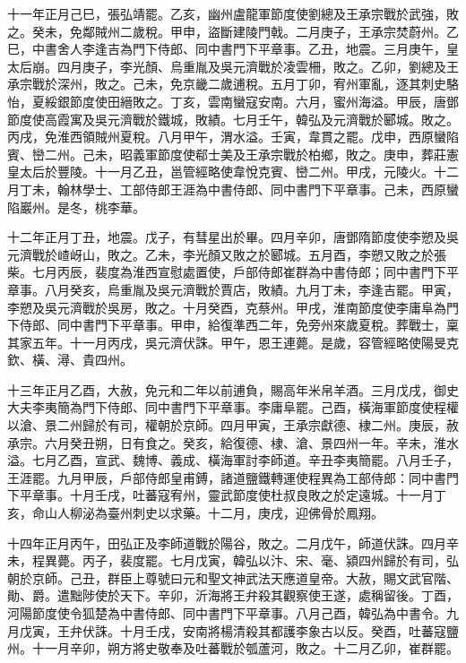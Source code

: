 \begin{pinyinscope}
 十一年正月己巳，張弘靖罷。乙亥，幽州盧龍軍節度使劉總及王承宗戰於武強，敗之。癸未，免鄰賊州二歲稅。甲申，盜斷建陵門戟。二月庚子，王承宗焚蔚州。乙巳，中書舍人李逢吉為門下侍郎、同中書門下平章事。乙丑，地震。三月庚午，皇太后崩。四月庚子，李光顏、烏重胤及吳元濟戰於凌雲柵，敗之。乙卯，劉總及王承宗戰於深州，敗之。己未，免京畿二歲逋稅。五月丁卯，宥州軍亂，逐其刺史駱怡，夏綏銀節度使田縉敗之。丁亥，雲南蠻寇安南。六月，蜜州海溢。甲辰，唐鄧節度使高霞寓及吳元濟戰於鐵城，敗績。七月壬午，韓弘及元濟戰於郾城。敗之。丙戌，免淮西領賊州夏稅。八月甲午，渭水溢。壬寅，韋貫之罷。戊申，西原蠻陷賓、巒二州。己未，昭義軍節度使郗士美及王承宗戰於柏鄉，敗之。庚申，葬莊憲皇太后於豐陵。十一月乙丑，邕管經略使韋悅克賓、巒二州。甲戌，元陵火。十二月丁未，翰林學士、工部侍郎王涯為中書侍郎、同中書門下平章事。己未，西原蠻陷巖州。是冬，桃李華。



 十二年正月丁丑，地震。戊子，有彗星出於畢。四月辛卯，唐鄧隋節度使李愬及吳元濟戰於嵖岈山，敗之。乙未，李光顏又敗之於郾城。五月酉，李愬又敗之於張柴。七月丙辰，裴度為淮西宣慰處置使，戶部侍郎崔群為中書侍郎；同中書門下平章事。八月癸亥，烏重胤及吳元濟戰於賈店，敗績。九月丁未，李逢吉罷。甲寅，李愬及吳元濟戰於吳房，敗之。十月癸酉，克蔡州。甲戌，淮南節度使李庸阜為門下侍郎、同中書門下平章事。甲申，給復準西二年，免旁州來歲夏稅。葬戰士，稟其家五年。十一月丙戌，吳元濟伏誅。甲午，恩王連薨。是歲，容管經略使陽旻克欽、橫、潯、貴四州。



 十三年正月乙酉，大赦，免元和二年以前逋負，賜高年米帛羊酒。三月戊戌，御史大夫李夷簡為門下侍郎、同中書門下平章事。李庸阜罷。己酉，橫海軍節度使程權以滄、景二州歸於有司，權朝於京師。四月甲寅，王承宗獻德、棣二州。庚辰，赦承宗。六月癸丑朔，日有食之。癸亥，給復德、棣、滄、景四州一年。辛未，淮水溢。七月乙酉，宣武、魏博、義成、橫海軍討李師道。辛丑李夷簡罷。八月壬子，王涯罷。九月甲辰，戶部侍郎皇甫鎛，諸道鹽鐵轉運使程異為工部侍郎：同中書門下平章事。十月壬戌，吐蕃寇宥州，靈武節度使杜叔良敗之於定遠城。十一月丁亥，命山人柳泌為臺州刺史以求藥。十二月，庚戌，迎佛骨於鳳翔。



 十四年正月丙午，田弘正及李師道戰於陽谷，敗之。二月戊午，師道伏誅。四月辛未，程異薨。丙子，裴度罷。七月戊寅，韓弘以汴、宋、毫、潁四州歸於有司，弘朝於京師。己丑，群臣上尊號曰元和聖文神武法天應道皇帝。大赦，賜文武官階、勛、爵。遣黜陟使於天下。辛卯，沂海將王弁殺其觀察使王遂，處稱留後。丁酉，河陽節度使令狐楚為中書侍郎、同中書門下平章事。八月己酉，韓弘為中書令。九月戊寅，王弁伏誅。十月壬戌，安南將楊清殺其都護李象古以反。癸酉，吐蕃寇鹽州。十一月辛卯，朔方將史敬奉及吐蕃戰於瓠蘆河，敗之。十二月乙卯，崔群罷。




\end{pinyinscope}
